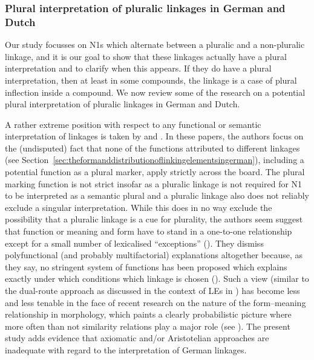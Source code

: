 \subsubsection{Plural interpretation of pluralic linkages in German and Dutch}
\label{sec:pluralinterpretationofpluraliclinkagesingermananddutch}

Our study focusses on N1s which alternate between a pluralic and a non-pluralic linkage, and it is our goal to show that these linkages actually have a plural interpretation and to clarify when this appears.
If they do have a plural interpretation, then at least in some compounds, the linkage is a case of plural inflection inside a compound.
We now review some of the research on a potential plural interpretation of pluralic linkages in German and Dutch.

A rather extreme position with respect to any functional or semantic interpretation of linkages is taken by \textcite{NeefBorgwaldt2012} and \textcite{Neef2015}.
In these papers, the authors focus on the (undisputed) fact that none of the functions attributed to different linkages (see Section~\ref{sec:theformanddistributionoflinkingelementsingerman}), including a potential function as a plural marker, apply strictly across the board.
The plural marking function is not strict insofar as a pluralic linkage is not required for N1 to be interpreted as a semantic plural and a pluralic linkage also does not reliably exclude a singular interpretation.
While this does in no way exclude the possibility that a pluralic linkage is a cue for plurality, the authors seem suggest that function or meaning and form have to stand in a one-to-one relationship except for a small number of lexicalised ``exceptions'' (\egg \citealt[42]{NeefBorgwaldt2012}).
They dismiss polyfunctional (and probably multifactorial) explanations altogether because, as they say, no stringent system of functions has been proposed which explains exactly under which conditions which linkage is chosen (\egg \citealt[27--29]{NeefBorgwaldt2012}).
Such a view (similar to the dual-route approach as discussed in the context of LEs in \citealt{KrottEa2007}) has become less and less tenable in the face of recent research on the nature of the form--meaning relationship in morphology, which paints a clearly probabilistic picture where more often than not similarity relations play a major role (see \citealt[107]{ArndtlappeEa2016}).
The present study adds evidence that axiomatic and\slash or Aristotelian approaches are inadequate with regard to the interpretation of German linkages.


